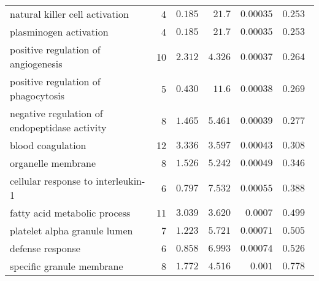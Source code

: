 \begin{longtable}{|l|r|r|r|r|r|}
    natural killer cell activation                        & 4                       & $ 0.185$                & $  21.7$     & $0.00035$            & $ 0.253~~$                      \\
    plasminogen activation                                & 4                       & $ 0.185$                & $  21.7$     & $0.00035$            & $ 0.253~~$                      \\
    positive regulation of angiogenesis                   & 10                      & $ 2.312$                & $ 4.326$   & $0.00037$            & $ 0.264~~$                      \\
    positive regulation of phagocytosis                   & 5                       & $ 0.430$                & $  11.6$     & $0.00038$            & $ 0.269~~$                      \\
    negative regulation of endopeptidase activity         & 8                       & $ 1.465$                & $ 5.461$   & $0.00039$            & $ 0.277~~$                      \\
    blood coagulation                                     & 12                      & $ 3.336$                & $ 3.597$   & $0.00043$            & $ 0.308~~$                      \\
    organelle membrane                                    & 8                       & $ 1.526$                & $ 5.242$   & $0.00049$            & $ 0.346~~$                      \\
    cellular response to interleukin-1                    & 6                       & $ 0.797$                & $ 7.532$   & $0.00055$            & $ 0.388~~$                      \\
    fatty acid metabolic process                          & 11                      & $ 3.039$                & $ 3.620$   & $0.0007$             & $ 0.499~~$                      \\
    platelet alpha granule lumen                          & 7                       & $ 1.223$                & $ 5.721$   & $0.00071$            & $ 0.505~~$                      \\
    defense response                                      & 6                       & $ 0.858$                & $ 6.993$   & $0.00074$            & $ 0.526~~$                      \\
    specific granule membrane                             & 8                       & $ 1.772$                & $ 4.516$   & $ 0.001$             & $ 0.778~~$                      \\

\end{longtable}
